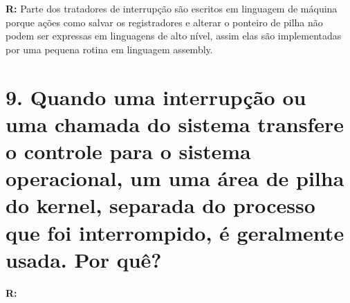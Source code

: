 \documentclass{article}
\begin{document}
\medskip
\noindent
\textbf{R:} Parte dos tratadores de interrupção são escritos em linguagem de máquina porque ações como salvar os registradores e alterar o ponteiro de pilha não podem ser expressas em linguagens de alto nível, assim elas são implementadas por uma pequena rotina em linguagem assembly.

\section*{9. \large Quando uma interrupção ou uma chamada do sistema transfere o controle para o sistema operacional, um uma área de pilha do kernel, separada do processo que foi interrompido, é geralmente usada. Por quê?}

\medskip
\noindent
\textbf{R: }
\end{document}
